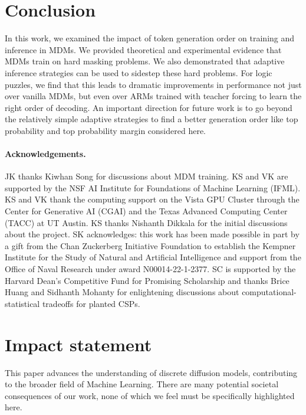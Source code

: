 \documentclass{article}
\theoremstyle{plain}
\theoremstyle{definition}
\theoremstyle{remark}
\newcounter{theo}
\begin{document}
\section{Conclusion}

In this work, we examined the impact of token generation order on training and inference in MDMs. We provided theoretical and experimental evidence that MDMs train on hard masking problems. We also demonstrated that adaptive inference strategies can be used to sidestep these hard problems. For logic puzzles, we find that this leads to dramatic improvements in performance not just over vanilla MDMs, but even over ARMs trained with teacher forcing to learn the right order of decoding. An important direction for future work is to go beyond the relatively simple adaptive strategies to find a better generation order like top probability and top probability margin considered here.

\paragraph{Acknowledgements.} JK thanks Kiwhan Song for discussions about MDM training. KS and VK are supported by the NSF AI Institute for Foundations of Machine Learning (IFML). KS and VK thank the computing support on the Vista GPU Cluster through the Center for Generative AI (CGAI) and the Texas Advanced Computing Center (TACC) at UT Austin. KS thanks Nishanth Dikkala for the initial discussions about the project. SK acknowledges: this work has been made possible in part by a
gift from the Chan Zuckerberg Initiative Foundation to establish the Kempner Institute
for the Study of Natural and Artificial Intelligence and support from the
Office of Naval Research under award N00014-22-1-2377. SC is supported by the Harvard Dean's Competitive Fund for Promising Scholarship and thanks Brice Huang and Sidhanth Mohanty for enlightening discussions about computational-statistical tradeoffs for planted CSPs. 

\section*{Impact statement}
This paper advances the understanding of discrete diffusion models, contributing to the broader field of Machine Learning. There are many potential societal consequences of our work, none of which we feel must be specifically highlighted here.





\newpage
\appendix
\onecolumn

\end{document}
